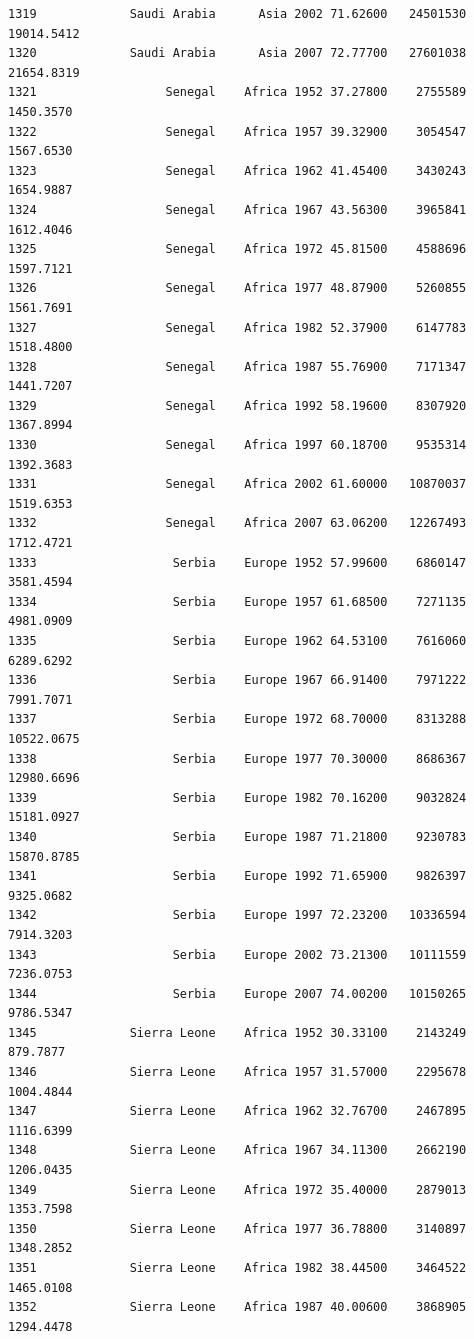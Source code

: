 \documentclass[
  letterpaper,
  DIV=11,
  numbers=noendperiod]{scrreprt}
\begin{document}
\begin{verbatim}
1319             Saudi Arabia      Asia 2002 71.62600   24501530  19014.5412
1320             Saudi Arabia      Asia 2007 72.77700   27601038  21654.8319
1321                  Senegal    Africa 1952 37.27800    2755589   1450.3570
1322                  Senegal    Africa 1957 39.32900    3054547   1567.6530
1323                  Senegal    Africa 1962 41.45400    3430243   1654.9887
1324                  Senegal    Africa 1967 43.56300    3965841   1612.4046
1325                  Senegal    Africa 1972 45.81500    4588696   1597.7121
1326                  Senegal    Africa 1977 48.87900    5260855   1561.7691
1327                  Senegal    Africa 1982 52.37900    6147783   1518.4800
1328                  Senegal    Africa 1987 55.76900    7171347   1441.7207
1329                  Senegal    Africa 1992 58.19600    8307920   1367.8994
1330                  Senegal    Africa 1997 60.18700    9535314   1392.3683
1331                  Senegal    Africa 2002 61.60000   10870037   1519.6353
1332                  Senegal    Africa 2007 63.06200   12267493   1712.4721
1333                   Serbia    Europe 1952 57.99600    6860147   3581.4594
1334                   Serbia    Europe 1957 61.68500    7271135   4981.0909
1335                   Serbia    Europe 1962 64.53100    7616060   6289.6292
1336                   Serbia    Europe 1967 66.91400    7971222   7991.7071
1337                   Serbia    Europe 1972 68.70000    8313288  10522.0675
1338                   Serbia    Europe 1977 70.30000    8686367  12980.6696
1339                   Serbia    Europe 1982 70.16200    9032824  15181.0927
1340                   Serbia    Europe 1987 71.21800    9230783  15870.8785
1341                   Serbia    Europe 1992 71.65900    9826397   9325.0682
1342                   Serbia    Europe 1997 72.23200   10336594   7914.3203
1343                   Serbia    Europe 2002 73.21300   10111559   7236.0753
1344                   Serbia    Europe 2007 74.00200   10150265   9786.5347
1345             Sierra Leone    Africa 1952 30.33100    2143249    879.7877
1346             Sierra Leone    Africa 1957 31.57000    2295678   1004.4844
1347             Sierra Leone    Africa 1962 32.76700    2467895   1116.6399
1348             Sierra Leone    Africa 1967 34.11300    2662190   1206.0435
1349             Sierra Leone    Africa 1972 35.40000    2879013   1353.7598
1350             Sierra Leone    Africa 1977 36.78800    3140897   1348.2852
1351             Sierra Leone    Africa 1982 38.44500    3464522   1465.0108
1352             Sierra Leone    Africa 1987 40.00600    3868905   1294.4478

\end{verbatim}
\end{document}
